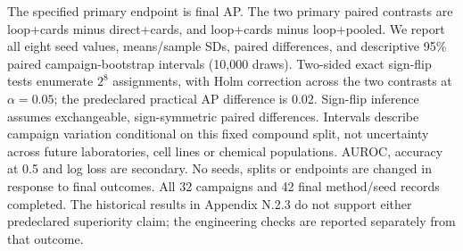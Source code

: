 The specified primary endpoint is final AP. The two primary paired
contrasts are loop+cards minus direct+cards, and loop+cards minus loop+pooled.
We report all eight seed values, means/sample SDs, paired differences,
and descriptive 95\% paired campaign-bootstrap intervals (10,000 draws).
Two-sided exact sign-flip tests enumerate $2^8$ assignments, with Holm
correction across the two contrasts at $\alpha=0.05$; the predeclared
practical AP difference is 0.02. Sign-flip inference assumes exchangeable,
sign-symmetric paired differences. Intervals describe campaign variation
conditional on this fixed compound split, not uncertainty across future
laboratories, cell lines or chemical populations. AUROC, accuracy at 0.5
and log loss are secondary. No seeds, splits or endpoints are changed in
response to final outcomes. All 32 campaigns and 42 final method/seed
records completed. The historical results in Appendix N.2.3 do not support either
predeclared superiority claim; the engineering checks are reported
separately from that outcome.
